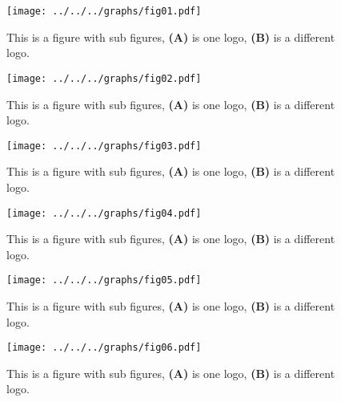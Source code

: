 \documentclass[utf8]{frontiersSCNS} %
\begin{document}
\begin{figure}[h!]
    \begin{center}
        \texttt{[image: ../../../graphs/fig01.pdf]}
    \end{center}
    \caption{This is a figure with sub figures, \textbf{(A)} is one logo, \textbf{(B)} is a different logo.}\label{fig:1}
\end{figure}

\begin{figure}[h!]
    \begin{center}
        \texttt{[image: ../../../graphs/fig02.pdf]}
    \end{center}
    \caption{This is a figure with sub figures, \textbf{(A)} is one logo, \textbf{(B)} is a different logo.}\label{fig:2}
\end{figure}


\begin{figure}[h!]
    \begin{center}
        \texttt{[image: ../../../graphs/fig03.pdf]}
    \end{center}
    \caption{This is a figure with sub figures, \textbf{(A)} is one logo, \textbf{(B)} is a different logo.}\label{fig:3}
\end{figure}


\begin{figure}[h!]
    \begin{center}
        \texttt{[image: ../../../graphs/fig04.pdf]}
    \end{center}
    \caption{This is a figure with sub figures, \textbf{(A)} is one logo, \textbf{(B)} is a different logo.}\label{fig:4}
\end{figure}


\begin{figure}[h!]
    \begin{center}
        \texttt{[image: ../../../graphs/fig05.pdf]}
    \end{center}
    \caption{This is a figure with sub figures, \textbf{(A)} is one logo, \textbf{(B)} is a different logo.}\label{fig:5}
\end{figure}


\begin{figure}[h!]
    \begin{center}
        \texttt{[image: ../../../graphs/fig06.pdf]}
    \end{center}
    \caption{This is a figure with sub figures, \textbf{(A)} is one logo, \textbf{(B)} is a different logo.}\label{fig:6}
\end{figure}
\end{document}
